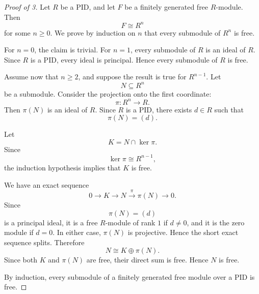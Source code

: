         \begin{proof}[Proof of 3]
        Let \(R\) be a PID, and let \(F\) be a finitely generated free \(R\)-module. Then
        \[
            F\cong R^n
        \]
        for some \(n\geq 0\). We prove by induction on \(n\) that every submodule of \(R^n\)
        is free.
        
        For \(n=0\), the claim is trivial. For \(n=1\), every submodule of \(R\) is an ideal of
        \(R\). Since \(R\) is a PID, every ideal is principal. Hence every submodule of \(R\)
        is free.
        
        Assume now that \(n\geq 2\), and suppose the result is true for \(R^{n-1}\). Let
        \[
            N\subseteq R^n
        \]
        be a submodule. Consider the projection onto the first coordinate:
        \[
            \pi:R^n\longrightarrow R.
        \]
        Then \(\pi(N)\) is an ideal of \(R\). Since \(R\) is a PID, there exists \(d\in R\) such that
        \[
            \pi(N)=(d).
        \]
        
        Let
        \[
            K=N\cap \ker\pi.
        \]
        Since
        \[
            \ker\pi\cong R^{n-1},
        \]
        the induction hypothesis implies that \(K\) is free.
        
        We have an exact sequence
        \[
            0\longrightarrow K\longrightarrow N\xrightarrow{\ \pi\ }\pi(N)\longrightarrow 0.
        \]
        Since
        \[
            \pi(N)=(d)
        \]
        is a principal ideal, it is a free \(R\)-module of rank \(1\) if \(d\neq 0\), and it is
        the zero module if \(d=0\). In either case, \(\pi(N)\) is projective. Hence the short
        exact sequence splits. Therefore
        \[
            N\cong K\oplus \pi(N).
        \]
        Since both \(K\) and \(\pi(N)\) are free, their direct sum is free. Hence \(N\) is free.
        
        By induction, every submodule of a finitely generated free module over a PID is free.
        \end{proof}